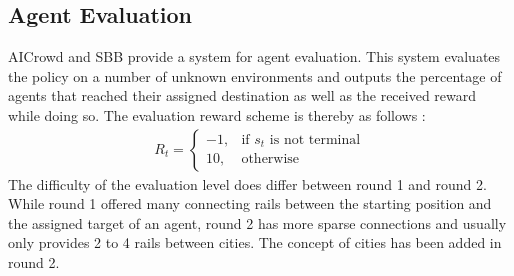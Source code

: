 \subsection*{Agent Evaluation}\label{rl_agent_eval}
AICrowd and SBB provide a system for agent evaluation. This system evaluates the policy on a number of unknown environments and outputs the percentage of agents that reached their assigned destination as well as the received reward while doing so. The evaluation reward scheme is thereby as follows \cite{flatland_faq}:
\begin{gather*}
R_{t}= 
\begin{cases}
-1,				& \text{if } s_{t} \text{ is not terminal}\\
10,             & \text{otherwise}
\end{cases}
\end{gather*}
The difficulty of the evaluation level does differ between round 1 and round 2. While round 1 offered many connecting rails between the starting position and the assigned target of an agent, round 2 has more sparse connections and usually only provides 2 to 4 rails between cities. The concept of cities has been added in round 2.

